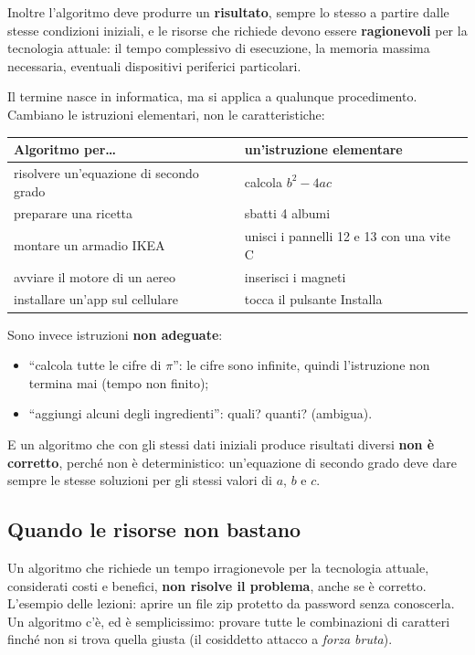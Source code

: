 Inoltre l'algoritmo deve produrre un \textbf{risultato}, sempre lo stesso a
partire dalle stesse condizioni iniziali, e le risorse che richiede devono
essere \textbf{ragionevoli} per la tecnologia attuale: il tempo complessivo
di esecuzione, la memoria massima necessaria, eventuali dispositivi
periferici particolari.

Il termine nasce in informatica, ma si applica a qualunque procedimento.
Cambiano le istruzioni elementari, non le caratteristiche:

\begin{center}
\renewcommand{\arraystretch}{1.3}
\begin{tabular}{@{}ll@{}}
  \toprule
  \textbf{Algoritmo per\dots} & \textbf{un'istruzione elementare} \\
  \midrule
  risolvere un'equazione di secondo grado & calcola $b^2 - 4ac$ \\
  preparare una ricetta                   & sbatti 4 albumi \\
  montare un armadio IKEA                 & unisci i pannelli 12 e 13 con una vite C \\
  avviare il motore di un aereo           & inserisci i magneti \\
  installare un'app sul cellulare         & tocca il pulsante Installa \\
  \bottomrule
\end{tabular}
\end{center}

Sono invece istruzioni \textbf{non adeguate}:

\begin{itemize}
  \item “calcola tutte le cifre di $\pi$”: le cifre sono infinite, quindi
        l'istruzione non termina mai (tempo non finito);
  \item “aggiungi alcuni degli ingredienti”: quali? quanti? (ambigua).
\end{itemize}

E un algoritmo che con gli stessi dati iniziali produce risultati diversi
\textbf{non è corretto}, perché non è deterministico: un'equazione di
secondo grado deve dare sempre le stesse soluzioni per gli stessi valori di
$a$, $b$ e $c$.

\subsection{Quando le risorse non bastano}

Un algoritmo che richiede un tempo irragionevole per la tecnologia attuale,
considerati costi e benefici, \textbf{non risolve il problema}, anche se è
corretto. L'esempio delle lezioni: aprire un file zip protetto da password
senza conoscerla. Un algoritmo c'è, ed è semplicissimo: provare tutte le
combinazioni di caratteri finché non si trova quella giusta (il cosiddetto
attacco a \textit{forza bruta}).

